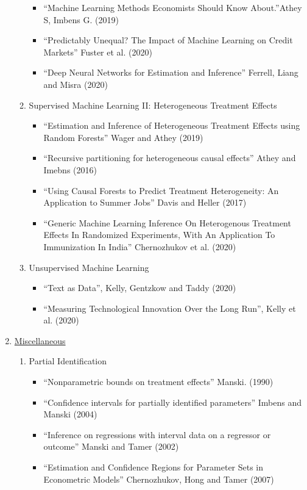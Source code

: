 \documentclass[11pt, a4paper]{article}
\begin{document}
\begin{enumerate}
\begin{enumerate}
\begin{itemize}
    \item ``Machine Learning Methods Economists Should Know About.''Athey S, Imbens G.  (2019)
    \item ``Predictably Unequal? The Impact of Machine Learning on Credit Markets'' Fuster et al. (2020)
    \item ``Deep Neural Networks for Estimation and Inference'' Ferrell, Liang and Misra (2020)
    \end{itemize}
  \item Supervised Machine Learning II: Heterogeneous Treatment Effects
    \begin{itemize}
    \item ``Estimation and Inference of Heterogeneous Treatment Effects using Random Forests'' Wager and Athey (2019)
    \item ``Recursive partitioning for heterogeneous causal effects'' Athey and Imebns (2016)
    \item ``Using Causal Forests to Predict Treatment Heterogeneity:  An Application to Summer Jobs'' Davis and Heller (2017)
    \item ``Generic Machine Learning Inference On Heterogenous
      Treatment Effects In Randomized Experiments, With An Application
      To Immunization In India'' Chernozhukov et al. (2020)
    \end{itemize}
  \item Unsupervised Machine Learning
    \begin{itemize}
    \item ``Text as Data'', Kelly, Gentzkow and Taddy (2020)
    \item ``Measuring Technological Innovation Over the Long Run'', Kelly et al. (2020)
    \end{itemize}
  \end{enumerate}
\item \underline{Miscellaneous}
  \begin{enumerate}
  \item Partial Identification
    \begin{itemize}
    \item ``Nonparametric bounds on treatment effects'' Manski. (1990)
    \item ``Confidence intervals for partially identified parameters'' Imbens and Manski (2004)
    \item ``Inference on regressions with interval data on a regressor or outcome'' Manski and Tamer (2002)
    \item ``Estimation and Confidence Regions for Parameter Sets in Econometric Models'' Chernozhukov, Hong and Tamer (2007)
    \end{itemize}
  \end{enumerate}
\end{enumerate}
\end{document}

